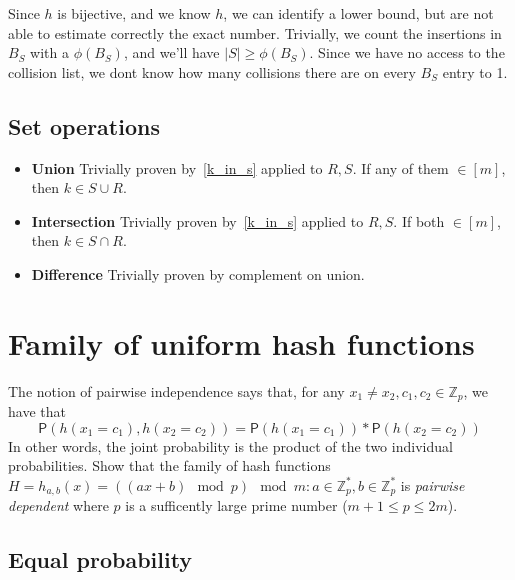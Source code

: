 \documentclass{article}
\newcommand*{\prob}{\mathsf{P}}    %
\begin{document}
Since $h$ is bijective, and we know $h$, we can identify a lower bound, but are
not able to estimate correctly the exact number.
Trivially, we count the insertions in $B_S$ with a $\phi(B_S)$, and we'll have
$|S| \geq \phi(B_S)$.
Since we have no access to the collision list, we dont know how many collisions
there are on every $B_S$ entry to 1.

\subsection{Set operations}

\begin{itemize}
    \item \textbf{Union} Trivially proven by~\ref{k_in_s} applied to $R, S$.
    If any of them $\in [m]$, then $k \in S \cup R$.
    \item \textbf{Intersection} Trivially proven by~\ref{k_in_s} applied to $R, S$.
    If both $\in [m]$, then $k \in S \cap R$.
    \item \textbf{Difference} Trivially proven by complement on union.
\end{itemize}



\newpage
\section{Family of uniform hash functions}

The notion of pairwise independence says that, for any $x_{1} \neq x_{2}, c_{1}, c_{2}
\in \mathbb{Z}_{p}$, we have that
    \begin{equation}
    \prob(h(x_{1} = c_{1}), h(x_{2} = c_{2})) = \prob(h(x_{1} = c_{1})) * \prob(h(x_{2} = c_{2}))
    \end{equation}
In other words, the joint probability is the product of the two individual probabilities.
Show that the family of hash functions $H = {h_{a,b}(x) = ((ax + b) \mod p) \mod m}:
a \in \mathbb{Z}^{*}_{p},
b \in \mathbb{Z}^{*}_{p}$ is \emph{pairwise dependent}
where $p$ is a sufficently large prime number ($m + 1 \leq p \leq 2m$).

\subsection{Equal probability}
\end{document}
